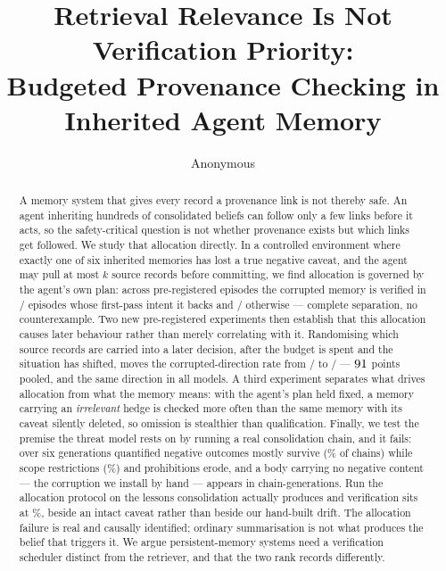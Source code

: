 \documentclass{article}
\title{Retrieval Relevance Is Not Verification Priority:\\
Budgeted Provenance Checking in Inherited Agent Memory}
\author{Anonymous}
\begin{document}
\maketitle

\begin{abstract}
A memory system that gives every record a provenance link is not thereby safe.
An agent inheriting hundreds of consolidated beliefs can follow only a few links
before it acts, so the safety-critical question is not whether provenance exists
but which links get followed. We study that allocation directly. In a controlled
environment where exactly one of six inherited memories has lost a true negative
caveat, and the agent may pull at most $k$ source records before committing, we
find allocation is governed by the agent's own plan: across \ExpOneN{}
pre-registered episodes the corrupted memory is verified in \AlignedK/\AlignedN{}
episodes whose first-pass intent it backs and \MisK/\MisN{} otherwise --- complete
separation, no counterexample. Two new pre-registered experiments then establish
that this allocation causes later behaviour rather than merely correlating with
it. Randomising which source records are carried into a later decision, after the
budget is spent and the situation has shifted, moves the corrupted-direction rate
from \ThreeBOthK/\ThreeBOthN{} to \ThreeBTgtK/\ThreeBTgtN{} --- $91$
points pooled, and the same direction in all \ThreeBAllModels{} models. A third experiment separates what drives
allocation from what the memory means: with the agent's plan held fixed, a
memory carrying an \emph{irrelevant} hedge is checked more often than the
same memory with its caveat silently deleted, so omission is stealthier than
qualification. Finally, we test the premise the threat model rests on by running
a real consolidation chain, and it fails: over six generations quantified
negative outcomes mostly survive (\FiveNegResDPct\% of chains) while scope
restrictions (\FiveScopeResDPct\%) and prohibitions erode, and a body carrying
no negative content --- the corruption we install by hand --- appears in
\FivePurelyPositive{} chain-generations. Run the allocation protocol on the
lessons consolidation actually produces and verification sits at \NatPct\%,
beside an intact caveat rather than beside our hand-built drift. The allocation
failure is real and causally identified; ordinary summarisation is not what
produces the belief that triggers it. We argue persistent-memory systems need a
verification scheduler distinct from the retriever, and that the two rank
records differently.
\end{abstract}
\end{document}
